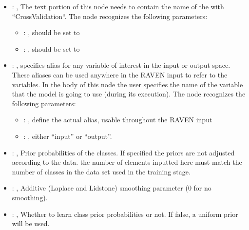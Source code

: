 \begin{itemize}
    \item {}: , 
      The text portion of this node needs to contain the name of the  with
               ``CrossValidation``.
      The  node recognizes the following parameters:
        \begin{itemize}
          \item {}: , 
            should be set to 
          \item {}: , 
            should be set to 
      \end{itemize}

    \item {}: , 
      specifies alias for         any variable of interest in the input or output space. These
      aliases can be used anywhere in the RAVEN input to         refer to the variables. In the body
      of this node the user specifies the name of the variable that the model is going to use
      (during its execution).
      The  node recognizes the following parameters:
        \begin{itemize}
          \item {}: , 
            define the actual alias, usable throughout the RAVEN input
          \item {}: , 
            either ``input'' or ``output''.
      \end{itemize}

    \item {}: , 
      Prior probabilities of the classes. If specified the priors are
      not adjusted according to the data. \nb the number of elements inputted here must
      match the number of classes in the data set used in the training stage.

    \item {}: , 
      Additive (Laplace and Lidstone) smoothing parameter (0 for no smoothing).

    \item {}: , 
      Whether to learn class prior probabilities or not. If false, a uniform
      prior will be used.
  \end{itemize}


